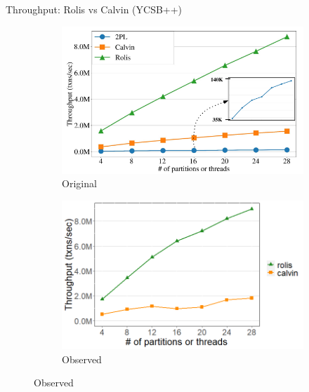 \documentclass[xcolor=dvipsnames]{beamer}
\begin{document}
    \begin{frame}{Throughput: Rolis vs Calvin (YCSB++)}
        \begin{figure}
            \begin{subfigure}[h]{0.5\linewidth}
                \includegraphics[scale=0.40]{rolis_fig12.png}
                \caption{Original}
            \end{subfigure}%
            \hfill
            \begin{subfigure}[h]{0.5\linewidth}
                \includegraphics[scale=0.30]{fig12.png}
                \caption{Observed}
            \end{subfigure}           
        \end{figure}
    \end{frame}
\end{document}
